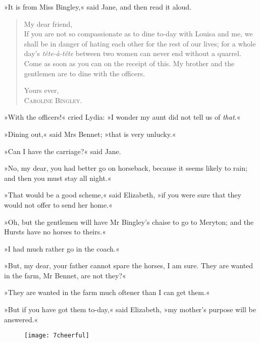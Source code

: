 »It is from Miss Bingley,« said Jane, and then read it aloud.


\begin{samepage}
\begin{quotation}
\noindent My dear friend,\\

\indent If you are not so compassionate as to dine to-day with Louisa and me, we shall be in danger of hating each other for the rest of our lives; for a whole day's \textit{tête-à-tête} between two women can never end without a quarrel. Come as soon as you can on the receipt of this. My brother and the gentlemen are to dine with the officers.
\vspace{-8pt}
\begin{flushright}
Yours ever,\\
\textsc{Caroline Bingley.}
\end{flushright}
\end{quotation}
\end{samepage}

»With the officers!« cried Lydia: »I wonder my aunt did not tell us of \textit{that}.«

»Dining out,« said Mrs Bennet; »that is very unlucky.«

»Can I have the carriage?« said Jane.

»No, my dear, you had better go on horseback, because it seems likely to rain; and then you must stay all night.«

»That would be a good scheme,« said Elizabeth, »if you were sure that they would not offer to send her home.«

»Oh, but the gentlemen will have Mr Bingley's chaise to go to Meryton; and the Hursts have no horses to theirs.«

»I had much rather go in the coach.«

»But, my dear, your father cannot spare the horses, I am sure. They are wanted in the farm, Mr Bennet, are not they?«


»They are wanted in the farm much oftener than I can get them.«

»But if you have got them to-day,« said Elizabeth, »my mother's purpose will be answered.«

\begin{a4}
	\begin{figure}[tbh]
	\centering
	\texttt{[image: 7cheerful]}
	\end{figure}
\end{a4}

